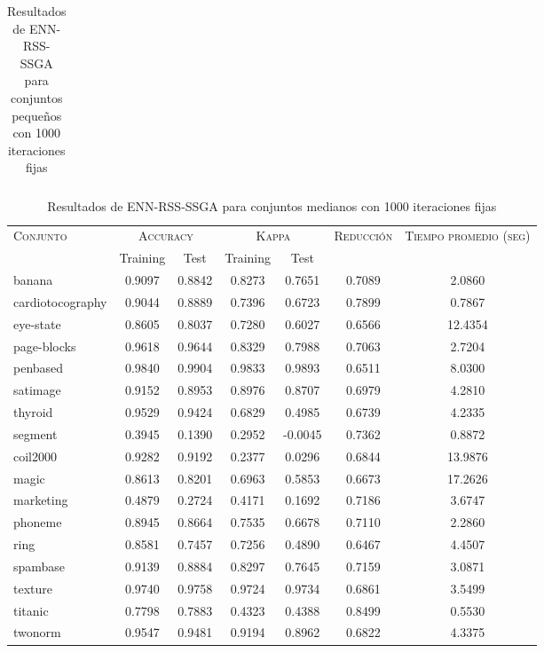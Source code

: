 \begin{table}[]
\begin{tabular}{l c c c c c c}
\hline
\end{tabular}
\caption{Resultados de ENN-RSS-SSGA para conjuntos pequeños con 1000 iteraciones fijas}
\label{res-peq-ENN-RSS-ssga}
\end{table}


\begin{table}[]
\centering
\begin{tabular}{l c c c c c c}
\hline
\multirow{2}{*}{\textsc{Conjunto}}
	& \multicolumn{2}{c}{\textsc{Accuracy}}
	& \multicolumn{2}{c}{\textsc{Kappa}}
	& \textsc{Reducción}
	& \textsc{Tiempo promedio (seg)} \\
	& Training & Test
	& Training & Test \\ 
\hline
\hline

banana & 0.9097 & 0.8842 & 0.8273 & 0.7651 & 0.7089 & 2.0860 \\
cardiotocography & 0.9044 & 0.8889 & 0.7396 & 0.6723 & 0.7899 & 0.7867 \\
eye-state & 0.8605 & 0.8037 & 0.7280 & 0.6027 & 0.6566 & 12.4354 \\
page-blocks & 0.9618 & 0.9644 & 0.8329 & 0.7988 & 0.7063 & 2.7204 \\
penbased & 0.9840 & 0.9904 & 0.9833 & 0.9893 & 0.6511 & 8.0300 \\
satimage & 0.9152 & 0.8953 & 0.8976 & 0.8707 & 0.6979 & 4.2810 \\
thyroid & 0.9529 & 0.9424 & 0.6829 & 0.4985 & 0.6739 & 4.2335 \\
segment & 0.3945 & 0.1390 & 0.2952 & -0.0045 & 0.7362 & 0.8872 \\
coil2000 & 0.9282 & 0.9192 & 0.2377 & 0.0296 & 0.6844 & 13.9876 \\
magic & 0.8613 & 0.8201 & 0.6963 & 0.5853 & 0.6673 & 17.2626 \\
marketing & 0.4879 & 0.2724 & 0.4171 & 0.1692 & 0.7186 & 3.6747 \\
phoneme & 0.8945 & 0.8664 & 0.7535 & 0.6678 & 0.7110 & 2.2860 \\
ring & 0.8581 & 0.7457 & 0.7256 & 0.4890 & 0.6467 & 4.4507 \\
spambase & 0.9139 & 0.8884 & 0.8297 & 0.7645 & 0.7159 & 3.0871 \\
texture & 0.9740 & 0.9758 & 0.9724 & 0.9734 & 0.6861 & 3.5499 \\
titanic & 0.7798 & 0.7883 & 0.4323 & 0.4388 & 0.8499 & 0.5530 \\
twonorm & 0.9547 & 0.9481 & 0.9194 & 0.8962 & 0.6822 & 4.3375 \\

\hline
\end{tabular}
\caption{Resultados de ENN-RSS-SSGA para conjuntos medianos con 1000 iteraciones fijas}
\label{res-med-ENN-RSS-ssga}
\end{table}


